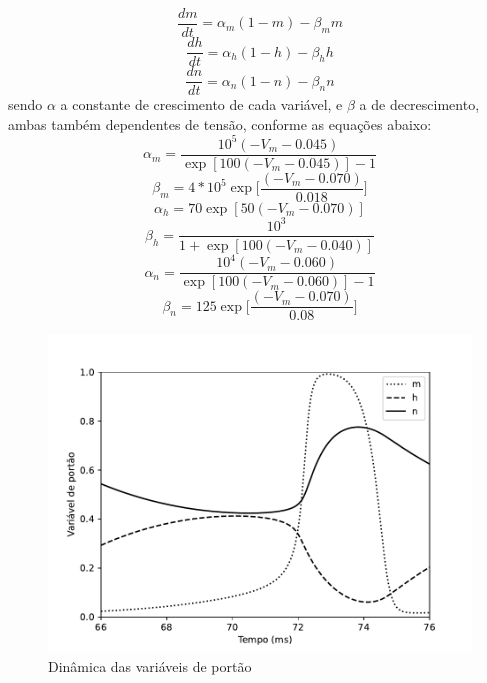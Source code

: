 \begin{equation}\label{eq:dmdt}
	\frac{dm}{dt}=\alpha_m(1-m)-\beta_mm
\end{equation}
\begin{equation}\label{eq:dhdt}
	\frac{dh}{dt}=\alpha_h(1-h)-\beta_hh
\end{equation}
\begin{equation}\label{eq:dndt}
	\frac{dn}{dt}=\alpha_n(1-n)-\beta_nn
\end{equation}
sendo $\alpha$ a constante de crescimento de cada variável, e $\beta$ a de decrescimento, ambas também dependentes de tensão, conforme as equações abaixo:
\begin{equation}\label{eq:alpha_m}
	\alpha_m=\frac{10^5(-V_m-0.045)}{\exp[100(-V_m-0.045)]-1}
\end{equation}
\begin{equation}\label{eq:beta_m}
	\beta_m=4*10^5\exp\Big[\frac{(-V_m-0.070)}{0.018}\Big]
\end{equation}
\begin{equation}\label{eq:alpha_h}
	\alpha_h=70\exp[50(-V_m-0.070)]
\end{equation}
\begin{equation}\label{eq:beta_h}
	\beta_h=\frac{10^3}{1+\exp[100(-V_m-0.040)]}
\end{equation}
\begin{equation}\label{eq:alpha_n}
	\alpha_n=\frac{10^4(-V_m-0.060)}{\exp[100(-V_m-0.060)]-1}
\end{equation}
\begin{equation}\label{eq:beta_n}
	\beta_n=125\exp\Big[\frac{(-V_m-0.070)}{0.08}\Big]
\end{equation}
\begin{figure}[tb]
	\centering
	\caption{Dinâmica das variáveis de portão}
	\label{fig:portoes}
	\includegraphics[width=0.7\linewidth]{figs/portoes}
\end{figure}
